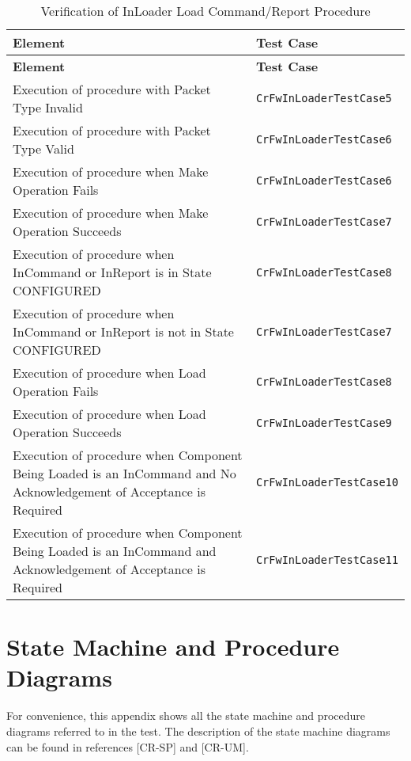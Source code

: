 \documentclass{pnp_article}
\begin{document}
\begin{longtable}{|>{\raggedright}p{8.0cm}|P{5.0cm}|}
\caption{Verification of InLoader Load Command/Report Procedure}
\label{tab:verInLoaderLoadCmdRepProc}\\
\hline
{}
\textbf{Element} & \textbf{Test Case} \\
\hline
\endfirsthead
{}
\textbf{Element} & \textbf{Test Case} \\
\hline
\endhead
Execution of procedure with Packet Type Invalid & \texttt{CrFwInLoaderTestCase5}\\
\hline
Execution of procedure with Packet Type Valid & \texttt{CrFwInLoaderTestCase6}\\
\hline
Execution of procedure when Make Operation Fails & \texttt{CrFwInLoaderTestCase6}\\
\hline
Execution of procedure when Make Operation Succeeds & \texttt{CrFwInLoaderTestCase7}\\
\hline
Execution of procedure when InCommand or InReport is in State CONFIGURED & \texttt{CrFwInLoaderTestCase8}\\
\hline
Execution of procedure when InCommand or InReport is not in State CONFIGURED & \texttt{CrFwInLoaderTestCase7}\\
\hline
Execution of procedure when Load Operation Fails & \texttt{CrFwInLoaderTestCase8}\\
\hline
Execution of procedure when Load Operation Succeeds & \texttt{CrFwInLoaderTestCase9}\\
\hline
Execution of procedure when Component Being Loaded is an InCommand and No Acknowledgement of Acceptance is Required & \texttt{CrFwInLoaderTestCase10}\\
\hline
Execution of procedure when Component Being Loaded is an InCommand and Acknowledgement of Acceptance is Required & \texttt{CrFwInLoaderTestCase11}\\
\hline
\end{longtable}

\section{State Machine and Procedure Diagrams}\label{sec:smAndProcDiagrams}
For convenience, this appendix shows all the state machine and procedure diagrams referred to  in the test. The description of the state machine diagrams can be found in references [CR-SP] and [CR-UM].
\end{document}
